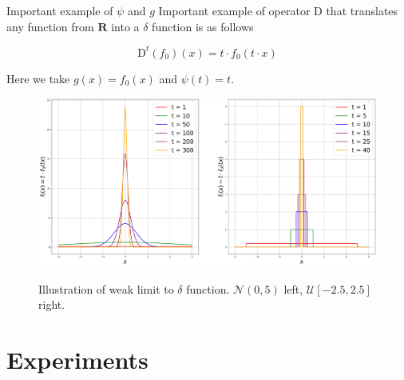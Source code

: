 \documentclass[10pt]{beamer}
\begin{document}
    \begin{frame}{Important example of $\psi$ and $g$}
        \small
        Important example of operator $\text{D}$ that translates any function from $\mathbf{R}$ into a $\delta$ function is as follows

        \begin{equation*}
            \text{D}^t(f_0)(x) = t \cdot f_0(t \cdot x)
        \end{equation*}

        Here we take $g(x) = f_0(x)$ and $\psi(t) = t$. 

        \begin{figure}[h!]
            \centering
            \includegraphics[scale = 0.19]{pictures/example1.png}
            
            Illustration of weak limit to $\delta$ function. $\mathcal{N}(0, 5)$ left, $\mathcal{U}[-2.5, 2.5]$ right.
            \label{example1_fig}
        \end{figure}
        
    \end{frame}

\section{Experiments}
\end{document}

